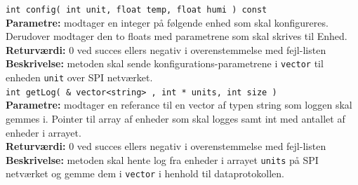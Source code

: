 \verb+int config( int unit, float temp, float humi ) const +\\
\textbf{Parametre:} modtager en integer på følgende enhed som skal konfigureres. Derudover modtager den to floats med parametrene som skal skrives til Enhed. \\
\textbf{Returværdi:}  0 ved succes ellers negativ i overenstemmelse med fejl-listen   \\
\textbf{Beskrivelse:} metoden skal sende konfigurations-parametrene i \verb+vector+ til enheden \verb+unit+ over SPI netværket.\\

\verb+int getLog( & vector<string> , int * units, int size )+ \\
\textbf{Parametre:}  modtager en referance til en vector af typen string som loggen skal gemmes i. Pointer til array af enheder som skal logges samt int med antallet af enheder i arrayet. \\
\textbf{Returværdi:}  0 ved succes ellers negativ i overenstemmelse med fejl-listen   \\
\textbf{Beskrivelse:} metoden skal hente log fra enheder i arrayet \verb+units+ på SPI netværket og gemme dem i \verb+vector+ i henhold til dataprotokollen. \\
